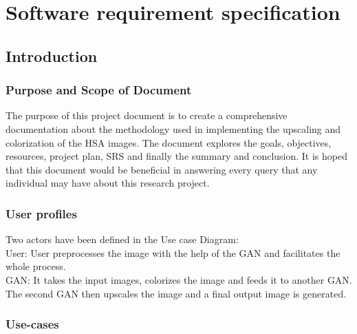 \documentclass[oneside,a4paper,12pt]{report}
\begin{document}
\chapter{Software requirement specification }

\section{Introduction}
\subsection{Purpose and Scope of Document}
The purpose of this project document is to create a comprehensive documentation about the methodology used in implementing the upscaling and colorization of the HSA images. The document explores the goals, objectives, resources, project plan, SRS and finally the summary and conclusion. It is hoped that this document would be beneficial in answering every query that any individual may have about this research project.



 \subsection{User profiles}
Two actors have been defined in the Use case Diagram:\\
User: User preprocesses the image with the help of the GAN and facilitates the whole process.\\
GAN: It takes the input images, colorizes the image and feeds it to another GAN. The second GAN then upscales the image and a final output image is generated.

\subsection{Use-cases}



\pagebreak
\end{document}
